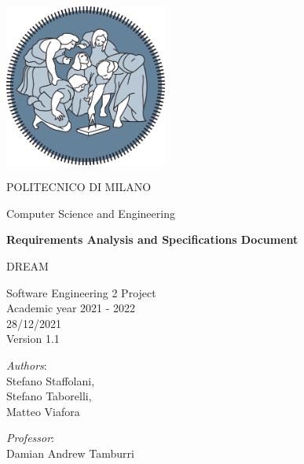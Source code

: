 \begin{titlepage}
    \begin{center}
		\includegraphics[width=0.4\textwidth]{Images/logo_polimi.png}
		
		\vspace{0.25cm}
		
		\LARGE POLITECNICO DI MILANO\\
		
		\vspace{0.2cm}
		
		\Large Computer Science and Engineering
		
		\vspace{0.8cm}
	
		\Huge \textbf{Requirements Analysis and Specifications Document}
		
		\vspace{0.5cm}
		\huge DREAM 
		
		\vspace{1.5cm}
		\LARGE Software Engineering 2 Project\\
		\Large Academic year 2021 - 2022\\
		\vspace{1cm}
		28/12/2021
		\\Version 1.1
		\vspace{2.5cm}
		
		\large
		\begin{minipage}{.1\textwidth}
			\null
		\end{minipage}%
		\begin{minipage}{.4\textwidth}
			\textit{Authors}:\\
			Stefano Staffolani,\\
			Stefano Taborelli,\\
			Matteo Viafora
		\end{minipage}%
		\begin{minipage}{.4\textwidth}
			\raggedleft	
			\textit{Professor}:\\
			Damian Andrew Tamburri\\
			\phantom{placeholder}
		\end{minipage}%
		\begin{minipage}{.1\textwidth}
			\null
		\end{minipage}
	
			
		\end{center}
\end{titlepage}